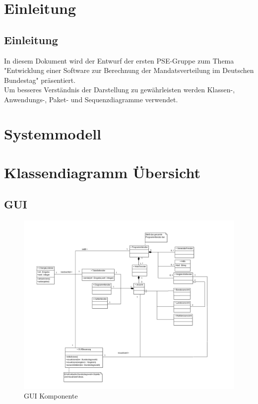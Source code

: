 \documentclass[12pt,a4paper,titlepage]{article}
\begin{document}
\section{Einleitung}

\subsection{Einleitung}
In diesem Dokument  wird der Entwurf der ersten PSE-Gruppe zum Thema "Entwicklung
einer Software zur Berechnung der Mandatsverteilung im Deutschen Bundestag"
präsentiert. \\
Um besseres Verständnis der Darstellung zu gewährleisten werden Klassen-, 
Anwendungs-, Paket- und Sequenzdiagramme verwendet. \\

\section{Systemmodell}
\section{Klassendiagramm Übersicht}
\subsection{GUI}
\begin{figure}[!ht]
\includegraphics[scale=0.4]{GUI-Abschnitt.png} \caption{GUI Komponente} 
\end{figure}
\end{document}
